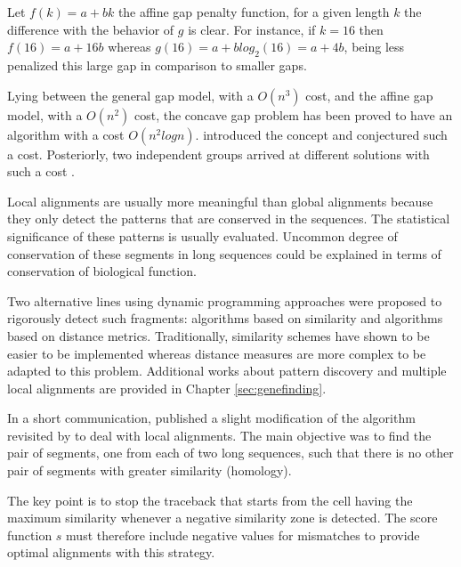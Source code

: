 Let $f(k) = a + bk$ the affine gap penalty function, for a given length $k$ the difference with the
behavior of $g$ is clear. For instance, if $k = 16$ then $f(16) = a + 16b$ whereas 
$g(16) = a + b log_2(16) = a+ 4b$, being less penalized this large gap in comparison to smaller gaps.


Lying between the general gap model, with a $O(n^3)$ cost, and the affine gap model, with
a $O(n^2)$ cost, the concave gap problem has been proved to have an algorithm with a cost $O(n^2logn)$. 
\citet{waterman:1984b} introduced the concept and conjectured such a cost. Posteriorly, two independent 
groups arrived at different solutions with such a cost \citep{eppstein:1988a,miller:1988a}.


\label{sec:local}

Local alignments are usually more meaningful than global alignments because they only detect the patterns that
are conserved in the sequences. The statistical significance of these patterns is usually evaluated. Uncommon 
degree of conservation of these segments in long sequences could be explained in terms of conservation of
biological function.

Two alternative lines using dynamic programming approaches were proposed to rigorously detect such
fragments: algorithms based on similarity and algorithms based on distance metrics. Traditionally, similarity schemes 
have shown to be easier to be implemented whereas distance measures are more complex to be adapted to this problem.
Additional works about pattern discovery and multiple local alignments are provided in Chapter \ref{sec:genefinding}.

\label{localsim}

 
In a short communication, \citet{smith:1981c} published a slight modification of the 
\citeauthor{needleman:1970a} algorithm revisited by \citet{smith:1981b} to deal with local alignments.
The main objective was to find the pair of segments, one from each of two long sequences, such that there
is no other pair of segments with greater similarity (homology).

The key point is to stop the traceback that starts from the cell having the maximum similarity whenever
a negative similarity zone is detected. The score function $s$ must therefore include negative values
for mismatches to provide optimal alignments with this strategy.

